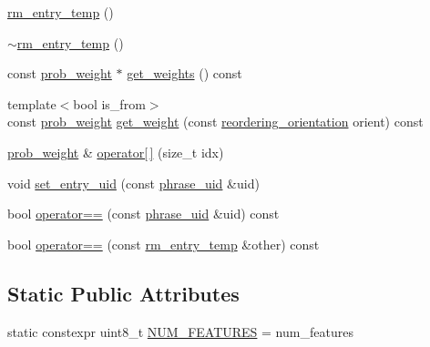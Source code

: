 \begin{DoxyCompactItemize}
\item 
\hyperlink{classuva_1_1smt_1_1bpbd_1_1server_1_1rm_1_1models_1_1rm__entry__temp_a6884470729968c0a97cb9a96b2741938}{rm\+\_\+entry\+\_\+temp} ()
\item 
\hyperlink{classuva_1_1smt_1_1bpbd_1_1server_1_1rm_1_1models_1_1rm__entry__temp_a33240bd873249585c99f705f0bbba127}{$\sim$rm\+\_\+entry\+\_\+temp} ()
\item 
const \hyperlink{namespaceuva_1_1smt_1_1bpbd_1_1server_a01e9ea4de9c226f4464862e84ff0bbcc}{prob\+\_\+weight} $\ast$ \hyperlink{classuva_1_1smt_1_1bpbd_1_1server_1_1rm_1_1models_1_1rm__entry__temp_aed3eecb82e2aafd4ca18a31651a3fa9b}{get\+\_\+weights} () const 
\item 
{\footnotesize template$<$bool is\+\_\+from$>$ }\\const \hyperlink{namespaceuva_1_1smt_1_1bpbd_1_1server_a01e9ea4de9c226f4464862e84ff0bbcc}{prob\+\_\+weight} \hyperlink{classuva_1_1smt_1_1bpbd_1_1server_1_1rm_1_1models_1_1rm__entry__temp_ac908fa992731bb32de497094477cef9e}{get\+\_\+weight} (const \hyperlink{namespaceuva_1_1smt_1_1bpbd_1_1server_1_1rm_1_1models_ad5c3e828e24fc03450e32df9c511e1ef}{reordering\+\_\+orientation} orient) const 
\item 
\hyperlink{namespaceuva_1_1smt_1_1bpbd_1_1server_a01e9ea4de9c226f4464862e84ff0bbcc}{prob\+\_\+weight} \& \hyperlink{classuva_1_1smt_1_1bpbd_1_1server_1_1rm_1_1models_1_1rm__entry__temp_ac47f1c9f47d71d6861b69af6aa2eafe8}{operator\mbox{[}$\,$\mbox{]}} (size\+\_\+t idx)
\item 
void \hyperlink{classuva_1_1smt_1_1bpbd_1_1server_1_1rm_1_1models_1_1rm__entry__temp_a6a60605bda4d714ea8a5c2d209b71016}{set\+\_\+entry\+\_\+uid} (const \hyperlink{namespaceuva_1_1smt_1_1bpbd_1_1server_ad18d4cdf5504e76c22b0c124ff60b44f}{phrase\+\_\+uid} \&uid)
\item 
bool \hyperlink{classuva_1_1smt_1_1bpbd_1_1server_1_1rm_1_1models_1_1rm__entry__temp_a067a585a9fcb90df1d4d68d147c29705}{operator==} (const \hyperlink{namespaceuva_1_1smt_1_1bpbd_1_1server_ad18d4cdf5504e76c22b0c124ff60b44f}{phrase\+\_\+uid} \&uid) const 
\item 
bool \hyperlink{classuva_1_1smt_1_1bpbd_1_1server_1_1rm_1_1models_1_1rm__entry__temp_a979947e1de8331632555fdac5377a8db}{operator==} (const \hyperlink{classuva_1_1smt_1_1bpbd_1_1server_1_1rm_1_1models_1_1rm__entry__temp}{rm\+\_\+entry\+\_\+temp} \&other) const 
\end{DoxyCompactItemize}
\subsection*{Static Public Attributes}
\begin{DoxyCompactItemize}
\item 
static constexpr uint8\+\_\+t \hyperlink{classuva_1_1smt_1_1bpbd_1_1server_1_1rm_1_1models_1_1rm__entry__temp_abdb659b8543d65e61d77ce4f6a7590d1}{N\+U\+M\+\_\+\+F\+E\+A\+T\+U\+R\+E\+S} = num\+\_\+features
\end{DoxyCompactItemize}
